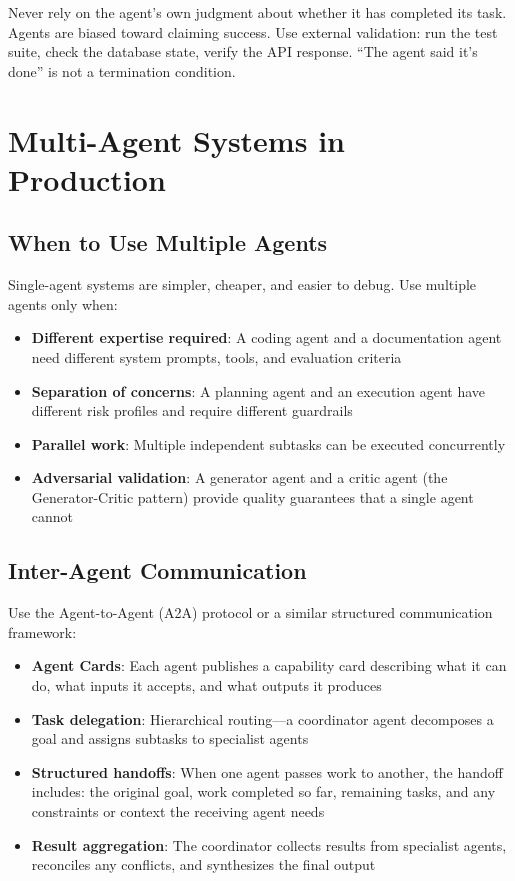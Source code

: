 \begin{cautionbox}
Never rely on the agent's own judgment about whether it has completed its task. Agents are biased toward claiming success. Use external validation: run the test suite, check the database state, verify the API response. ``The agent said it's done'' is not a termination condition.
\end{cautionbox}


\section{Multi-Agent Systems in Production}

\subsection{When to Use Multiple Agents}

Single-agent systems are simpler, cheaper, and easier to debug. Use multiple agents only when:

\begin{itemize}[leftmargin=*]
    \item \textbf{Different expertise required}: A coding agent and a documentation agent need different system prompts, tools, and evaluation criteria
    \item \textbf{Separation of concerns}: A planning agent and an execution agent have different risk profiles and require different guardrails
    \item \textbf{Parallel work}: Multiple independent subtasks can be executed concurrently
    \item \textbf{Adversarial validation}: A generator agent and a critic agent (the Generator-Critic pattern) provide quality guarantees that a single agent cannot
\end{itemize}

\subsection{Inter-Agent Communication}

Use the Agent-to-Agent (A2A) protocol or a similar structured communication framework:

\begin{itemize}[leftmargin=*]
    \item \textbf{Agent Cards}: Each agent publishes a capability card describing what it can do, what inputs it accepts, and what outputs it produces
    \item \textbf{Task delegation}: Hierarchical routing---a coordinator agent decomposes a goal and assigns subtasks to specialist agents
    \item \textbf{Structured handoffs}: When one agent passes work to another, the handoff includes: the original goal, work completed so far, remaining tasks, and any constraints or context the receiving agent needs
    \item \textbf{Result aggregation}: The coordinator collects results from specialist agents, reconciles any conflicts, and synthesizes the final output
\end{itemize}

